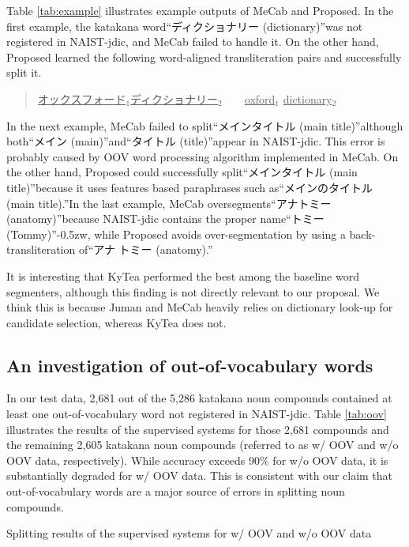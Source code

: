 \documentclass[english]{jnlp_1.4_rep}
\begin{document}
Table \ref{tab:example} illustrates example outputs of {\sc MeCab} and
{\sc Proposed}. In the first example, the katakana word“ディクショナリー
(dictionary)”was not registered in NAIST-jdic, and {\sc MeCab} failed to
handle it. On the other hand, {\sc Proposed} learned the following
word-aligned transliteration pairs and successfully split it.

\begin{quote}
 \underline{オックスフォード}$_1$\underline{ディクショナリー}$_2$\ \ \ \
 \underline{oxford\vphantom{y}}$_1$ \underline{dictionary}$_2$
\end{quote}

\noindent
In the next example, {\sc MeCab} failed to split“メインタイトル (main
title)”although both“メイン (main)”and“タイトル (title)”appear
in NAIST-jdic. This error is probably caused by OOV word processing
algorithm implemented in {\sc MeCab}. On the other hand, {\sc Proposed}
could successfully split“メインタイトル (main title)”because it uses
features based paraphrases such as“メインのタイトル (main title).”In
the last example, {\sc MeCab} oversegments“アナトミー (anatomy)”because NAIST-jdic contains the proper name“トミー (Tommy)”{\kern-0.5zw}, while {\sc
Proposed} avoids over-segmentation by using a back-transliteration of“アナ
トミー (anatomy).”

It is interesting that {\sc KyTea} performed the best among the
baseline word segmenters, although this finding is not directly relevant
to our proposal. We think this is because {\sc Juman} and
{\sc MeCab} heavily relies on dictionary look-up for candidate
selection, whereas {\sc KyTea} does not.


\subsection{An investigation of out-of-vocabulary words}

In our test data, 2,681 out of the 5,286 katakana noun compounds contained
at least one out-of-vocabulary word not registered in NAIST-jdic. Table
\ref{tab:oov} illustrates the results of the supervised systems for
those 2,681 compounds and the remaining 2,605 katakana noun compounds
(referred to as w/ OOV and w/o OOV data, respectively). While accuracy
exceeds 90\% for w/o OOV data, it is substantially degraded for w/ OOV
data. This is consistent with our claim that out-of-vocabulary words are
a major source of errors in splitting noun compounds.

\begin{table}[b]
    \caption{Splitting results of the supervised systems for w/ OOV and w/o OOV data}
    \label{tab:oov}

\end{table}
\end{document}
